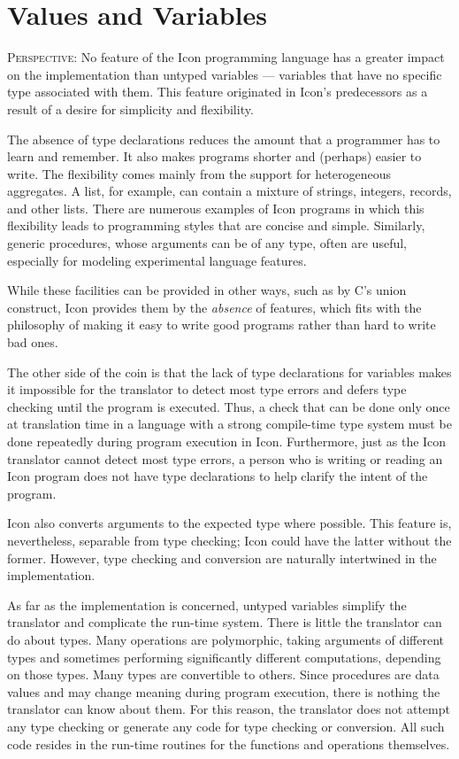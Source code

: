 \chapter{Values and Variables}

\textsc{Perspective}: No feature of the Icon programming language has
a greater impact on the implementation than untyped
variables --- variables that have no specific type associated with
them. This feature originated in Icon's predecessors as a result of a
desire for simplicity and flexibility.

The absence of type declarations reduces the amount that a programmer
has to learn and remember. It also makes programs shorter and
(perhaps) easier to write. The flexibility comes mainly from the
support for heterogeneous aggregates. A list, for example, can contain
a mixture of strings, integers, records, and other lists. There are
numerous examples of Icon programs in which this flexibility leads to
programming styles that are concise and simple. Similarly,
{\textquotedbl}generic{\textquotedbl} procedures, whose arguments can
be of any type, often are useful, especially for modeling experimental
language features.

While these facilities can be provided in other ways, such as by C's
union construct, Icon provides them by the \textit{absence} of
features, which fits with the philosophy of making it easy to write
good programs rather than hard to write bad ones.

The other side of the coin is that the lack of type declarations for
variables makes it impossible for the translator to detect most type
errors and defers type checking until the program is executed. Thus, a
check that can be done only once at translation time in a language
with a strong compile-time type system must be done repeatedly during
program execution in Icon. Furthermore, just as the Icon translator
cannot detect most type errors, a person who is writing or reading an
Icon program does not have type declarations to help clarify the
intent of the program.

Icon also converts arguments to the expected type where possible. This
feature is, nevertheless, separable from type checking; Icon could
have the latter without the former. However, type checking and
conversion are naturally intertwined in the implementation.

As far as the implementation is concerned, untyped variables simplify
the translator and complicate the run-time system.  There is little
the translator can do about types. Many operations are polymorphic,
taking arguments of different types and sometimes performing
significantly different computations, depending on those types. Many
types are convertible to others. Since procedures are data values and
may change meaning during program execution, there is nothing the
translator can know about them. For this reason, the translator does
not attempt any type checking or generate any code for type checking
or conversion. All such code resides in the run-time routines for the
functions and operations themselves.

